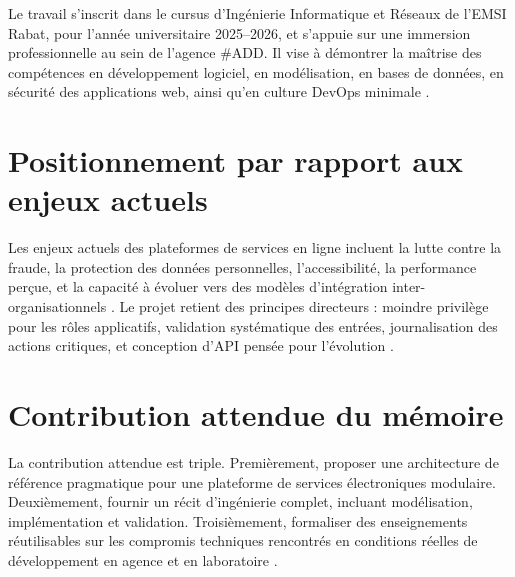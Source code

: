 Le travail s'inscrit dans le cursus d'Ingénierie Informatique et Réseaux de l'EMSI Rabat, pour l'année universitaire 2025--2026, et s'appuie sur une immersion professionnelle au sein de l'agence \#ADD. Il vise à démontrer la maîtrise des compétences en développement logiciel, en modélisation, en bases de données, en sécurité des applications web, ainsi qu'en culture DevOps minimale \cite{bass2021,twelvefactor}.

\section{Positionnement par rapport aux enjeux actuels}

Les enjeux actuels des plateformes de services en ligne incluent la lutte contre la fraude, la protection des données personnelles, l'accessibilité, la performance perçue, et la capacité à évoluer vers des modèles d'intégration inter-organisationnels \cite{kleppmann2017,newman2021}. Le projet retient des principes directeurs : moindre privilège pour les rôles applicatifs, validation systématique des entrées, journalisation des actions critiques, et conception d'API pensée pour l'évolution \cite{fielding2000,fowler2002}.

\newpage
\section{Contribution attendue du mémoire}

La contribution attendue est triple. Premièrement, proposer une architecture de référence pragmatique pour une plateforme de services électroniques modulaire. Deuxièmement, fournir un récit d'ingénierie complet, incluant modélisation, implémentation et validation. Troisièmement, formaliser des enseignements réutilisables sur les compromis techniques rencontrés en conditions réelles de développement en agence et en laboratoire \cite{sommerville2016}.

